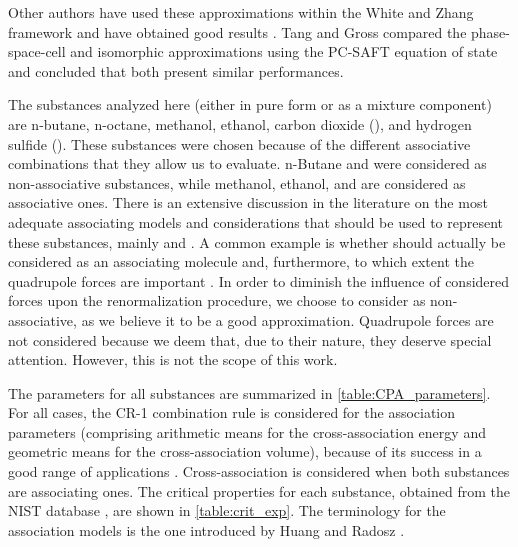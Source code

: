 \documentclass[preprint,12pt,3p]{elsarticle}
\begin{document}
Other authors have used these approximations within the White and Zhang framework \cite{white1993renormalization} and have obtained good results \cite{cai2004thermodynamics, llovell2006global, sun2005application, pcm2017application, xu2011prediction}.
Tang and Gross \citep{tang2010renormalization} compared the phase-space-cell and isomorphic approximations using the PC-SAFT equation of state and concluded that both present similar performances.

The substances analyzed here (either in pure form or as a mixture component) are n-butane, n-octane, methanol, ethanol, carbon dioxide (), and hydrogen sulfide ().
These substances were chosen because of the different associative combinations that they allow us to evaluate.
n-Butane and  were considered as non-associative substances, while methanol, ethanol, and  are considered as associative ones.
There is an extensive discussion in the literature on the most adequate associating models and considerations that should be used to represent these substances, mainly  \citep{bjorner2016modeling} and  \citep{ruffine2006represent}.
A common example is whether  should actually be considered as an associating molecule and, furthermore, to which extent the quadrupole forces are important \cite{tsivintzelis2011modeling,bjorner2016modeling}.
In order to diminish the influence of considered forces upon the renormalization procedure, we choose to consider  as non-associative, as we believe it to be a good approximation.
Quadrupole forces are not considered because we deem that, due to their nature, they deserve special attention.
However, this is not the scope of this work.

The parameters for all substances are summarized in \cref{table:CPA_parameters}.
For all cases, the \mbox{CR-1} combination rule is considered for the association parameters (comprising arithmetic means for the cross-association energy and geometric means for the cross-association volume), because of its success in a good range of applications \cite{folas2005application,folas2006application,kontogeorgis2006ten1,kontogeorgis2006ten2}.
Cross-association is considered when both substances are associating ones.
The critical properties for each substance, obtained from the NIST database \cite{nistfluids}, are shown in \cref{table:crit_exp}.
The terminology for the association models is the one introduced by Huang and Radosz \cite{huang1990equation}.
\end{document}
